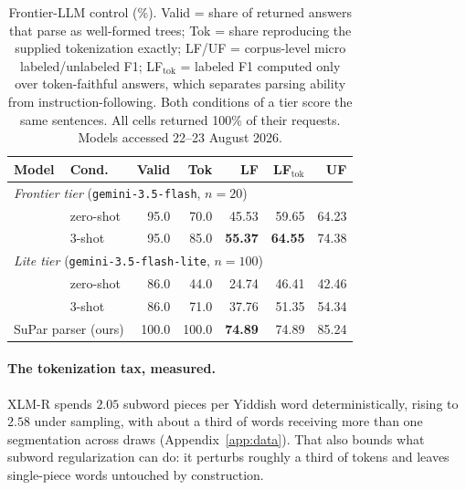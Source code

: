 \documentclass[11pt]{article}
\begin{document}
\begin{table}[t]
\centering
\small
\setlength{\tabcolsep}{5pt}
\begin{tabular}{@{}llrrrrr@{}}
\toprule
\textbf{Model} & \textbf{Cond.} & \textbf{Valid} & \textbf{Tok} & \textbf{LF} & \textbf{LF$_{\text{tok}}$} & \textbf{UF} \\
\midrule
\multicolumn{7}{l}{\emph{Frontier tier} (\texttt{gemini-3.5-flash}, $n{=}20$)} \\
\quad & zero-shot & 95.0 & 70.0 & 45.53 & 59.65 & 64.23 \\
\quad & 3-shot    & 95.0 & 85.0 & \textbf{55.37} & \textbf{64.55} & 74.38 \\
\midrule
\multicolumn{7}{l}{\emph{Lite tier} (\texttt{gemini-3.5-flash-lite}, $n{=}100$)} \\
\quad & zero-shot & 86.0 & 44.0 & 24.74 & 46.41 & 42.46 \\
\quad & 3-shot    & 86.0 & 71.0 & 37.76 & 51.35 & 54.34 \\
\midrule
\multicolumn{2}{l}{SuPar parser (ours)} & 100.0 & 100.0 & \textbf{74.89} & 74.89 & 85.24 \\
\bottomrule
\end{tabular}
\caption{Frontier-LLM control (\%). Valid = share of returned answers that parse
as well-formed trees; Tok = share reproducing the supplied tokenization exactly;
LF/UF = corpus-level micro labeled/unlabeled F1; LF$_{\text{tok}}$ = labeled F1
computed only over token-faithful answers, which separates parsing ability from
instruction-following. Both conditions of a tier score the same sentences.
All cells returned 100\% of their requests. Models accessed 22--23 August 2026.}
\label{tab:llm}
\end{table}

\paragraph{The tokenization tax, measured.} XLM-R spends $2.05$ subword pieces
per Yiddish word deterministically, rising to $2.58$ under sampling, with about a
third of words receiving more than one segmentation across draws
(Appendix~\ref{app:data}). That also bounds what subword regularization can do: it
perturbs roughly a third of tokens and leaves single-piece words untouched by
construction.
\end{document}
